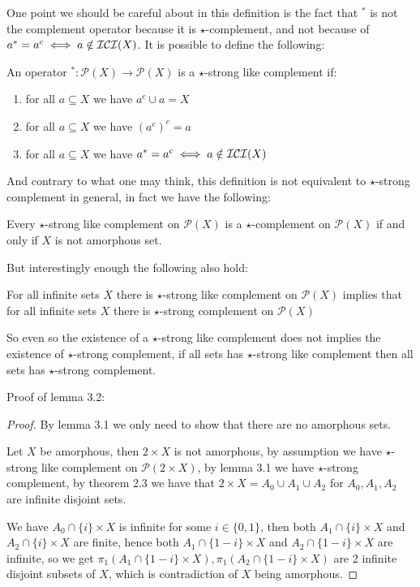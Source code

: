 	One point we should be careful about in this definition is the fact that $^*$ is not the complement operator because it is $\star$-complement, and not because of $a^*=a^c\iff a\notin \mathcal{ICI}(X)$.\newline
	It is possible to define the following:
	\begin{definition}
		An operator $^*:\mathcal{P}(X)\to \mathcal{P}(X)$ is a $\star$-strong like complement if: 
		\begin{enumerate}
			\item{ for all $a\subseteq X$ we have $a^c\cup a=X$}
			\item{ for all $a\subseteq X$ we have $(a^c)^c=a$}
			\item{ for all $a\subseteq X$ we have $a^*=a^c\iff a\notin \mathcal{ICI}(X)$}
		\end{enumerate}
	\end{definition}
	And contrary to what one may think, this definition is not equivalent to $\star$-strong complement in general, in fact we have the following:
	\begin{lemma}
		Every $\star$-strong like complement on $\mathcal{P}(X)$ is a $\star$-complement on $\mathcal{P}(X)$ if and only if $X$ is not amorphous set. 
	\end{lemma}
	But interestingly enough the following also hold:
	\begin{lemma}
		For all infinite sets $X$ there is $\star$-strong like complement on $\mathcal{P}(X)$ implies that for all infinite sets $X$ there is $\star$-strong complement on $\mathcal{P}(X)$
	\end{lemma}
	So even so the existence of a $\star$-strong like complement does not implies the existence of $\star$-strong complement, if all sets has $\star$-strong like complement then all sets has $\star$-strong complement.
	
	Proof of lemma 3.2:
	\begin{proof}
		By lemma 3.1 we only need to show that there are no amorphous sets.
		
		Let $X$ be amorphous, then $2\times X$ is not amorphous, by assumption we have $\star$-strong like complement on $\mathcal{P}(2\times X)$, by lemma 3.1 we have $\star$-strong complement, by theorem 2.3 we have that $2\times X=A_0\cup A_1\cup A_2$ for $A_0,A_1,A_2$ are infinite disjoint sets.
		
		We have $A_0\cap\{i\}\times X$ is infinite for some $i\in\{0,1\}$, then both $A_1\cap\{i\}\times X$ and $A_2\cap\{i\}\times X$ are finite, hence both $A_1\cap\{1-i\}\times X$ and $A_2\cap\{1-i\}\times X$ are infinite, so we get $\pi_1\left(A_1\cap\{1-i\}\times X\right), \pi_1\left(A_2\cap\{1-i\}\times X\right)$ are 2 infinite disjoint subsets of $X$, which is contradiction of $X$ being amorphous.
	\end{proof}
	
